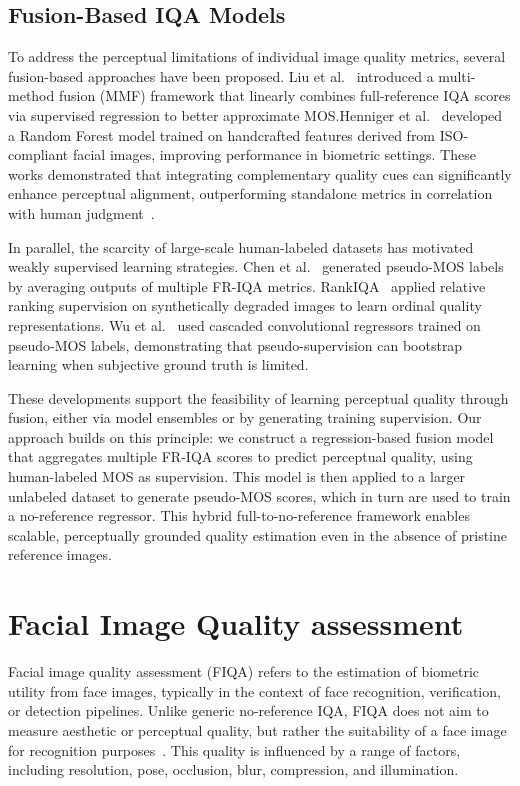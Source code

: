 \subsection{Fusion-Based IQA Models}\label{sec:fusion_iqa}

To address the perceptual limitations of individual image quality metrics, several fusion-based approaches have been proposed. Liu et al.~\cite{liu2013mmf} introduced a multi-method fusion (MMF) framework that linearly combines full-reference IQA scores via supervised regression to better approximate MOS.\@ Henniger et al.~\cite{henniger2020biosig} developed a Random Forest model trained on handcrafted features derived from ISO-compliant facial images, improving performance in biometric settings. These works demonstrated that integrating complementary quality cues can significantly enhance perceptual alignment, outperforming standalone metrics in correlation with human judgment~\cite{robinson2020bias}.

In parallel, the scarcity of large-scale human-labeled datasets has motivated weakly supervised learning strategies. Chen et al.~\cite{chen2021pseudo} generated pseudo-MOS labels by averaging outputs of multiple FR-IQA metrics. RankIQA~\cite{liu2017rankiqa} applied relative ranking supervision on synthetically degraded images to learn ordinal quality representations. Wu et al.~\cite{wu2020cascaded} used cascaded convolutional regressors trained on pseudo-MOS labels, demonstrating that pseudo-supervision can bootstrap learning when subjective ground truth is limited.

These developments support the feasibility of learning perceptual quality through fusion, either via model ensembles or by generating training supervision. Our approach builds on this principle: we construct a regression-based fusion model that aggregates multiple FR-IQA scores to predict perceptual quality, using human-labeled MOS as supervision. This model is then applied to a larger unlabeled dataset to generate pseudo-MOS scores, which in turn are used to train a no-reference regressor. This hybrid full-to-no-reference framework enables scalable, perceptually grounded quality estimation even in the absence of pristine reference images.

\section{Facial Image Quality assessment}\label{sec:fiqa}

Facial image quality assessment (FIQA) refers to the estimation of biometric utility from face images, typically in the context of face recognition, verification, or detection pipelines. Unlike generic no-reference IQA, FIQA does not aim to measure aesthetic or perceptual quality, but rather the suitability of a face image for recognition purposes~\cite{damer2021localfusion, best2018faceqnet}. This quality is influenced by a range of factors, including resolution, pose, occlusion, blur, compression, and illumination.


